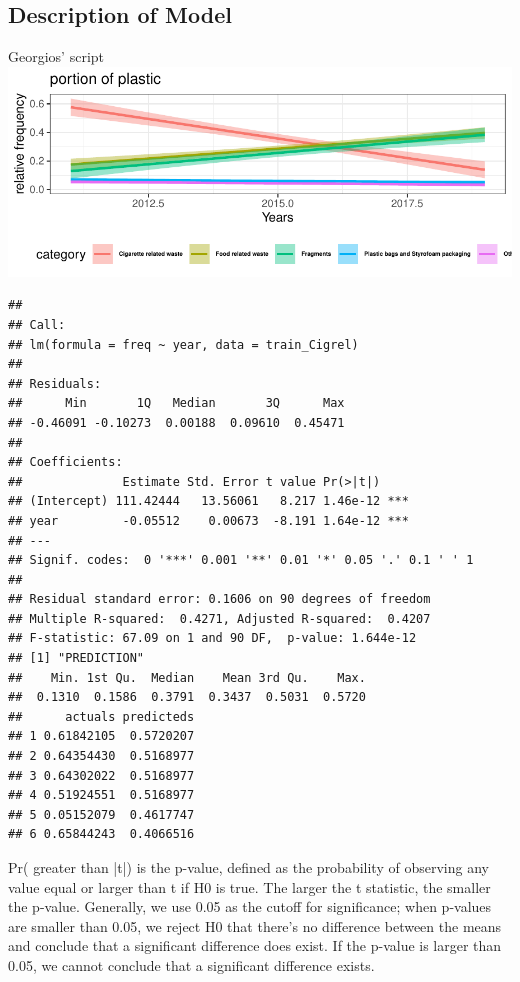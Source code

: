 \documentclass[10pt]{article}\usepackage[]{graphicx}\usepackage[]{color}
\makeatletter
\newenvironment{kframe}{%
 \def\at@end@of@kframe{}%
 \ifinner\ifhmode%
  \def\at@end@of@kframe{\end{minipage}}%
  \begin{minipage}{\columnwidth}%
 \fi\fi%
 \def\FrameCommand##1{\hskip\@totalleftmargin \hskip-\fboxsep
 \colorbox{shadecolor}{##1}\hskip-\fboxsep
     \hskip-\linewidth \hskip-\@totalleftmargin \hskip\columnwidth}%
 \MakeFramed {\advance\hsize-\width
   \@totalleftmargin\z@ \linewidth\hsize
   \@setminipage}}%
 {\par\unskip\endMakeFramed%
 \at@end@of@kframe}
\newenvironment{knitrout}{}{} %
\makeatother
\begin{document}
\subsection{Description of Model}

Georgios' script
\begin{knitrout}\small
{}\color{fgcolor}
\includegraphics[width=1\linewidth]{figure/unnamed-chunk-19-1} 
\begin{kframe}\begin{verbatim}
## 
## Call:
## lm(formula = freq ~ year, data = train_Cigrel)
## 
## Residuals:
##      Min       1Q   Median       3Q      Max 
## -0.46091 -0.10273  0.00188  0.09610  0.45471 
## 
## Coefficients:
##              Estimate Std. Error t value Pr(>|t|)    
## (Intercept) 111.42444   13.56061   8.217 1.46e-12 ***
## year         -0.05512    0.00673  -8.191 1.64e-12 ***
## ---
## Signif. codes:  0 '***' 0.001 '**' 0.01 '*' 0.05 '.' 0.1 ' ' 1
## 
## Residual standard error: 0.1606 on 90 degrees of freedom
## Multiple R-squared:  0.4271,	Adjusted R-squared:  0.4207 
## F-statistic: 67.09 on 1 and 90 DF,  p-value: 1.644e-12
## [1] "PREDICTION"
##    Min. 1st Qu.  Median    Mean 3rd Qu.    Max. 
##  0.1310  0.1586  0.3791  0.3437  0.5031  0.5720
##      actuals predicteds
## 1 0.61842105  0.5720207
## 2 0.64354430  0.5168977
## 3 0.64302022  0.5168977
## 4 0.51924551  0.5168977
## 5 0.05152079  0.4617747
## 6 0.65844243  0.4066516
\end{verbatim}
\end{kframe}
\end{knitrout}

Pr( greater than |t|) is the p-value, defined as the probability of observing any value equal or larger than t if H0 is true. The larger the t statistic, the smaller the p-value. Generally, we use 0.05 as the cutoff for significance; when p-values are smaller than 0.05, we reject H0 that there's no difference between the means and conclude that a significant difference does exist. If the p-value is larger than 0.05, we cannot conclude that a significant difference exists.
\end{document}
